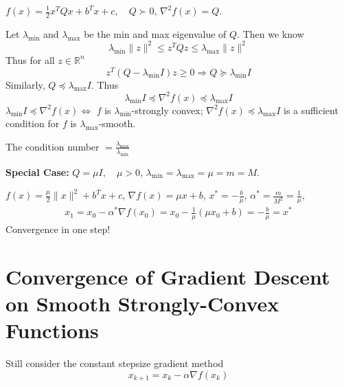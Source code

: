\documentclass[11pt]{elegantbook}
\begin{document}
\begin{example}
    $f(x)=\frac{1}{2}x^TQx+b^Tx+c,\quad Q\succ 0$, $\nabla^2 f(x)=Q$.
\end{example}
Let $\lambda_{\min}$ and $\lambda_{\max}$ be the min and max eigenvalue of $Q$. Then we know $$\lambda_{\min}\|z\|^2\leq z^TQz\leq \lambda_{\max}\|z\|^2$$
Thus for all $z\in \mathbb{R}^n$
$$z^T(Q-\lambda_{\min}I)z\geq 0 \Rightarrow	Q\succeq \lambda_{\min}I$$
Similarly, $Q\preceq \lambda_{\max}I$. Thus
$$\lambda_{\min}I\preceq \nabla^2 f(x)\preceq \lambda_{\max}I$$
$\lambda_{\min}I\preceq \nabla^2 f(x) \Leftrightarrow$ $f$ is $\lambda_{\min}$-strongly convex; $\nabla^2 f(x)\preceq \lambda_{\max}I$ is a sufficient condition for $f$ is $\lambda_{\max}$-smooth.

The condition number $=\frac{\lambda_{\max}}{\lambda_{\min}}$

\textbf{Special Case:} $Q=\mu I,\quad \mu>0$, $\lambda_{\min}=\lambda_{\max}=\mu=m=M$.

$f(x)=\frac{\mu}{2}\|x\|^2+b^Tx+c$, $\nabla f(x)=\mu x+b$, $x^*=-\frac{b}{\mu}$, $\alpha^*=\frac{m}{M^2}=\frac{1}{\mu}$,
\begin{equation}
    \begin{aligned}
        x_1=x_0-\alpha^*\nabla f(x_0)=x_0-\frac{1}{\mu}(\mu x_0+b)=-\frac{b}{\mu}=x^*
    \end{aligned}
    \nonumber
\end{equation}
Convergence in one step!

\section{Convergence of Gradient Descent on Smooth Strongly-Convex Functions}
Still consider the constant stepsize gradient method$$x_{k+1}=x_k-\alpha \nabla f(x_k)$$
\end{document}
